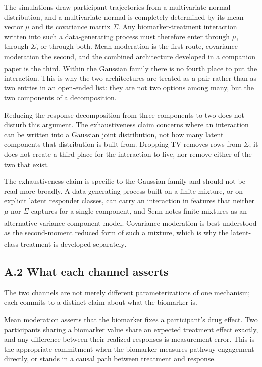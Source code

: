 \documentclass[
  11pt,
]{article}
\begin{document}
The simulations draw participant trajectories from a multivariate
normal distribution, and a multivariate normal is completely
determined by its mean vector \(\mu\) and its covariance matrix
\(\Sigma\). Any biomarker-treatment interaction written into such a
data-generating process must therefore enter through \(\mu\), through
\(\Sigma\), or through both. Mean moderation is the first route,
covariance moderation the second, and the combined architecture
developed in a companion paper\textsuperscript{} is the third.
Within the Gaussian family there is no fourth place to put the
interaction. This is why the two architectures are treated as a pair
rather than as two entries in an open-ended list: they are not two
options among many, but the two components of a decomposition.

Reducing the response decomposition from three components to two does
not disturb this argument. The exhaustiveness claim concerns where an
interaction can be written into a Gaussian joint distribution, not
how many latent components that distribution is built from. Dropping
TV removes rows from \(\Sigma\); it does not create a third place for
the interaction to live, nor remove either of the two that exist.

The exhaustiveness claim is specific to the Gaussian family and
should not be read more broadly. A data-generating process built on a
finite mixture, or on explicit latent responder classes, can carry an
interaction in features that neither \(\mu\) nor \(\Sigma\) captures for
a single component, and Senn notes finite mixtures as an alternative
variance-component model\textsuperscript{}. Covariance moderation
is best understood as the second-moment reduced form of such a
mixture, which is why the latent-class treatment is developed
separately\textsuperscript{}.

\subsection{A.2 What each channel asserts}

The two channels are not merely different parameterizations of one
mechanism; each commits to a distinct claim about what the biomarker
is.

Mean moderation asserts that the biomarker fixes a participant's drug
effect. Two participants sharing a biomarker value share an expected
treatment effect exactly, and any difference between their realized
responses is measurement error. This is the appropriate commitment
when the biomarker measures pathway engagement directly, or stands in
a causal path between treatment and response.
\end{document}
